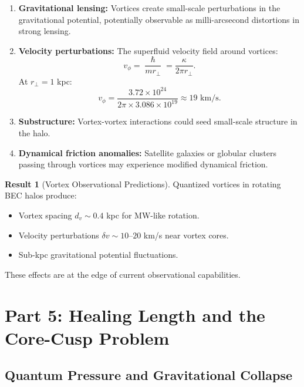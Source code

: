 \documentclass[11pt,a4paper]{article}
\newcommand{\hbar}{\ensuremath{\hslash}}
\theoremstyle{definition}
\newtheorem{result}{Result}
\theoremstyle{remark}
\begin{document}
\begin{enumerate}
    \item \textbf{Gravitational lensing:} Vortices create small-scale perturbations in the gravitational potential, potentially observable as milli-arcsecond distortions in strong lensing.

    \item \textbf{Velocity perturbations:} The superfluid velocity field around vortices:
    \begin{equation}
    v_\phi = \frac{\hbar}{mr_\perp} = \frac{\kappa}{2\pi r_\perp}.
    \end{equation}
    At $r_\perp = 1$ kpc:
    \begin{equation}
    v_\phi = \frac{3.72 \times 10^{24}}{2\pi \times 3.086 \times 10^{19}} \approx 19 \text{ km/s}.
    \end{equation}

    \item \textbf{Substructure:} Vortex-vortex interactions could seed small-scale structure in the halo.

    \item \textbf{Dynamical friction anomalies:} Satellite galaxies or globular clusters passing through vortices may experience modified dynamical friction.
\end{enumerate}

\begin{result}[Vortex Observational Predictions]
Quantized vortices in rotating BEC halos produce:
\begin{itemize}
    \item Vortex spacing $d_v \sim 0.4$ kpc for MW-like rotation.
    \item Velocity perturbations $\delta v \sim 10$--$20$ km/s near vortex cores.
    \item Sub-kpc gravitational potential fluctuations.
\end{itemize}
These effects are at the edge of current observational capabilities.
\end{result}

\section{Part 5: Healing Length and the Core-Cusp Problem}
\label{sec:healing_length}

\subsection{Quantum Pressure and Gravitational Collapse}
\label{sec:quantum_pressure}
\end{document}
